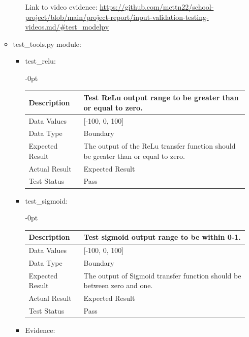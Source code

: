 \documentclass[./project-report/src/latex/project-report.tex]{subfiles}
\begin{document}
\begin{itemize}
\begin{itemize}
\begin{itemize}
						\pagebreak

						\begin{figure}[h!]
						\centering
						\end{figure}
	
						Link to video evidence: \url{https://github.com/mcttn22/school-project/blob/main/project-report/input-validation-testing-videos.md/#test_modelpy}

				\end{itemize}
            \item test\_tools.py module:
				\begin{itemize}
					\item test\_relu: \newline
					\begin{adjustwidth}{-\leftmargin}{0pt}
					\begin{tabular}{|p{0.25\linewidth}|p{0.75\linewidth}|}
						\hline
						Description & Test ReLu output range to be greater than or equal to zero. \\
						\hline
						Data Values & [-100, 0, 100] \\
						\hline
						Data Type & Boundary \\
						\hline
						Expected Result & The output of the ReLu transfer function should be greater than or equal to zero. \\
						\hline
						Actual Result & Expected Result \\
						\hline
						Test Status & Pass \\
						\hline
					\end{tabular}
					\end{adjustwidth}
					\item test\_sigmoid: \newline
					\begin{adjustwidth}{-\leftmargin}{0pt}
					\begin{tabular}{|p{0.25\linewidth}|p{0.75\linewidth}|}
						\hline
						Description & Test sigmoid output range to be within 0-1. \\
						\hline
						Data Values & [-100, 0, 100] \\
						\hline
						Data Type & Boundary \\
						\hline
						Expected Result & The output of Sigmoid transfer function should be between zero and one. \\
						\hline
						Actual Result & Expected Result \\
						\hline
						Test Status & Pass \\
						\hline
					\end{tabular}
					\end{adjustwidth}
					\item Evidence:
                		\inputminted{python}{./school_project/test/models/cpu/utils/test_tools.py}


\end{itemize}
\end{itemize}
\end{itemize}
\end{document}
